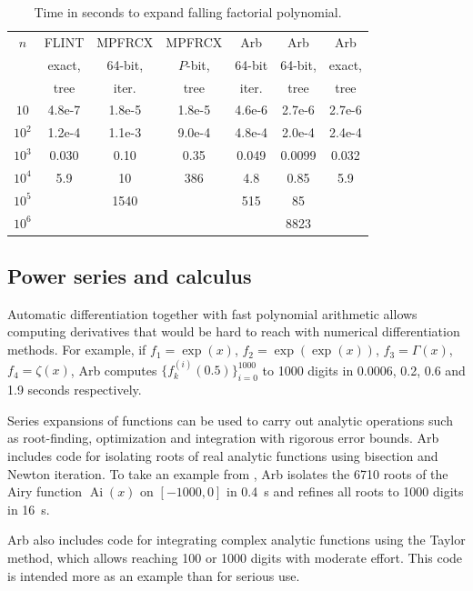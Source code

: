 \documentclass[10pt,journal,compsoc,cspaper]{IEEEtran}
\begin{document}
\begin{table}
\caption{Time in seconds to expand falling factorial polynomial.}
\label{tab:polymultime2}
\begin{center}
\renewcommand{\arraystretch}{1.2}
\begin{tabular}{c|c|c|c|c|c|c}
$n$     &  FLINT & MPFRCX & MPFRCX & Arb & Arb & Arb \\
        &  exact,  & 64-bit,   & $P$-bit, & 64-bit  &  64-bit, & exact, \\
        &  tree  & iter.   & tree   &  iter. & tree & tree \\ \hline
$10$    & 4.8e-7 & 1.8e-5 & 1.8e-5 & 4.6e-6 & 2.7e-6 & 2.7e-6 \\
$10^2$  & 1.2e-4 & 1.1e-3 & 9.0e-4 & 4.8e-4 & 2.0e-4 & 2.4e-4 \\
$10^3$  & 0.030  & 0.10   & 0.35    & 0.049 & 0.0099   & 0.032 \\
$10^4$  & 5.9    & 10    & 386     & 4.8 & 0.85    & 5.9 \\
$10^5$  &         & 1540    &         & 515 & 85     &   \\
$10^6$  &         &         &         & & 8823     &      \\
\end{tabular}
\end{center}
\end{table}

\subsection{Power series and calculus}

Automatic differentiation together with fast polynomial arithmetic
allows computing derivatives
that would be hard to reach with numerical differentiation methods.
For example, if $f_1 = \exp(x)$, $f_2 = \exp(\exp(x))$, $f_3 = \Gamma(x)$,
$f_4 = \zeta(x)$, Arb computes $\{f_k^{(i)}(0.5)\}_{i=0}^{1000}$ to 1000 digits
in 0.0006, 0.2, 0.6 and 1.9 seconds respectively.

Series expansions of functions
can be used to carry out analytic operations such as
root-finding, optimization and integration with rigorous error bounds.
Arb includes code for isolating roots of real analytic functions
using bisection and Newton iteration.
To take an example from \cite{Johansson2016hypergeometric},
Arb isolates the 6710 roots of the Airy function $\operatorname{Ai}(x)$ on $[-1000,0]$
in 0.4~s and refines all roots to 1000 digits in 16~s.

Arb also includes code for integrating complex analytic
functions using the Taylor method,
which allows reaching 100 or 1000 digits with moderate effort. This code is
intended more as an example than for serious use.
\end{document}
